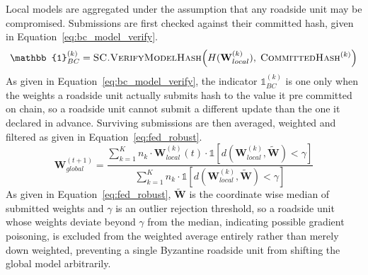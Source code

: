 \documentclass[final,5p,twocolumn]{elsarticle}
\theoremstyle{remark}
\theoremstyle{plain}
\begin{document}
Local models are aggregated under the assumption that any roadside unit may
be compromised. Submissions are first checked against their committed hash,
given in Equation~\eqref{eq:bc_model_verify}.
\begin{equation}
	\mathbb{1}_{BC}^{(k)} = \textsc{SC.VerifyModelHash}\!\left(H(\mathbf{W}_{local}^{(k)}),\; \textsc{CommittedHash}^{(k)}\right)
	\label{eq:bc_model_verify}
\end{equation}
As given in Equation~\eqref{eq:bc_model_verify}, the indicator
$\mathbb{1}_{BC}^{(k)}$ is one only when the weights a roadside unit
actually submits hash to the value it pre committed on chain, so a
roadside unit cannot submit a different update than the one it declared
in advance. Surviving submissions are then averaged, weighted and filtered as given in
Equation~\eqref{eq:fed_robust}.
\begin{equation}
	\mathbf{W}_{global}^{(t+1)} = \frac{\sum_{k=1}^{K} n_k \cdot \mathbf{W}_{local}^{(k)}(t) \cdot \mathbb{1}\!\left[d\!\left(\mathbf{W}_{local}^{(k)}, \tilde{\mathbf{W}}\right) < \gamma\right]}{\sum_{k=1}^{K} n_k \cdot \mathbb{1}\!\left[d\!\left(\mathbf{W}_{local}^{(k)}, \tilde{\mathbf{W}}\right) < \gamma\right]}
	\label{eq:fed_robust}
\end{equation}
As given in Equation~\eqref{eq:fed_robust}, $\tilde{\mathbf{W}}$ is the
coordinate wise median of submitted weights and $\gamma$ is an outlier
rejection threshold, so a roadside unit whose weights deviate beyond
$\gamma$ from the median, indicating possible gradient poisoning, is
excluded from the weighted average entirely rather than merely down
weighted, preventing a single Byzantine roadside unit from shifting the
global model arbitrarily.
\end{document}

